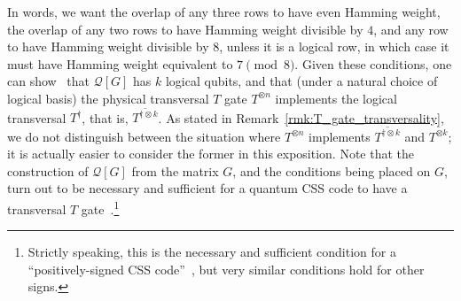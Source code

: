 \documentclass{article}
\begin{document}
In words, we want the overlap of any three rows to have even Hamming weight, the overlap of any two rows to have Hamming weight divisible by $4$, and any row to have Hamming weight divisible by $8$, unless it is a logical row, in which case it must have Hamming weight equivalent to $7 \pmod 8$. Given these conditions, one can show~\cite{hastings2018distillation,bravyi2012magic} that $\mathcal{Q}[G]$ has $k$ logical qubits, and that (under a natural choice of logical basis) the physical transversal $T$ gate $T^{\otimes n}$ implements the logical transversal $T^\dagger$, that is, $\overline{T^{\dagger \otimes k}}$. As stated in Remark~\ref{rmk:T_gate_transversality}, we do not distinguish between the situation where $T^{\otimes n}$ implements $\overline{T^{\dagger \otimes k}}$ and $\overline{T^{\otimes k}}$; it is actually easier to consider the former in this exposition. Note that the construction of $\mathcal{Q}[G]$ from the matrix $G$, and the conditions being placed on $G$, turn out to be necessary and sufficient for a quantum CSS code to have a transversal $T$ gate~\cite{rengaswamy2020optimality,hu2022designing}.\footnote{Strictly speaking, this is the necessary and sufficient condition for a ``positively-signed CSS code''~\cite{rengaswamy2020optimality,hu2022designing}, but very similar conditions hold for other signs.}
\end{document}
